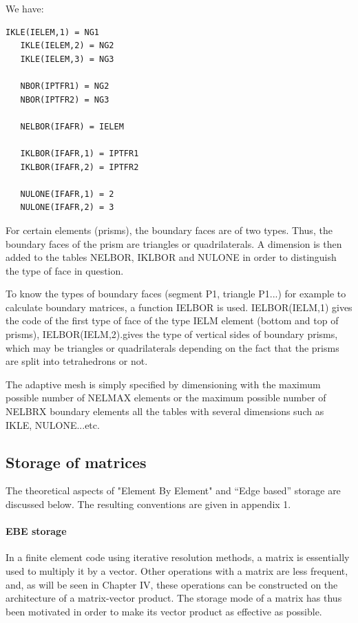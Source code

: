 We have:
\begin{lstlisting}[language=TelFortran]
   IKLE(IELEM,1) = NG1
   IKLE(IELEM,2) = NG2
   IKLE(IELEM,3) = NG3

   NBOR(IPTFR1) = NG2
   NBOR(IPTFR2) = NG3

   NELBOR(IFAFR) = IELEM

   IKLBOR(IFAFR,1) = IPTFR1
   IKLBOR(IFAFR,2) = IPTFR2

   NULONE(IFAFR,1) = 2
   NULONE(IFAFR,2) = 3
\end{lstlisting}

For certain elements (prisms), the boundary faces are of two types. Thus, the
boundary faces of the prism are triangles or quadrilaterals. A dimension is
then added to the tables NELBOR, IKLBOR and NULONE in order to distinguish the
type of face in question.

To know the types of boundary faces (segment P1, triangle P1...) for example to
calculate boundary matrices, a function IELBOR is used. IELBOR(IELM,1) gives
the code of the first type of face of the type IELM element (bottom and top of
prisms), IELBOR(IELM,2).gives the type of vertical sides of boundary prisms,
which may be triangles or quadrilaterals depending on the fact that the prisms
are split into tetrahedrons or not.

The adaptive mesh is simply specified by dimensioning with the maximum possible
number of NELMAX elements or the maximum possible number of NELBRX boundary
elements all the tables with several dimensions such as IKLE, NULONE...etc.

\subsection{Storage of matrices}

The theoretical aspects of "Element By Element" and ``Edge based'' storage are
discussed below. The resulting conventions are given in appendix 1.

\paragraph{EBE storage}

In a finite element code using iterative resolution methods, a matrix is
essentially used to multiply it by a vector. Other operations with a matrix are
less frequent, and, as will be seen in Chapter IV, these operations can be
constructed on the architecture of a matrix-vector product. The storage mode of
a matrix has thus been motivated in order to make its vector product as
effective as possible.

